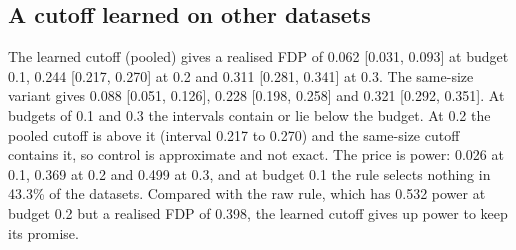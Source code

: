 \documentclass[10pt]{article}
\begin{document}
\subsection{A cutoff learned on other datasets}
The learned cutoff (pooled) gives a realised FDP of 0.062 [0.031, 0.093] at budget 0.1, 0.244 [0.217, 0.270] at 0.2 and 0.311 [0.281, 0.341] at 0.3. The same-size variant gives 0.088 [0.051, 0.126], 0.228 [0.198, 0.258] and 0.321 [0.292, 0.351]. At budgets of 0.1 and 0.3 the intervals contain or lie below the budget. At 0.2 the pooled cutoff is above it (interval 0.217 to 0.270) and the same-size cutoff contains it, so control is approximate and not exact. The price is power: 0.026 at 0.1, 0.369 at 0.2 and 0.499 at 0.3, and at budget 0.1 the rule selects nothing in 43.3\% of the datasets. Compared with the raw rule, which has 0.532 power at budget 0.2 but a realised FDP of 0.398, the learned cutoff gives up power to keep its promise.
\end{document}

